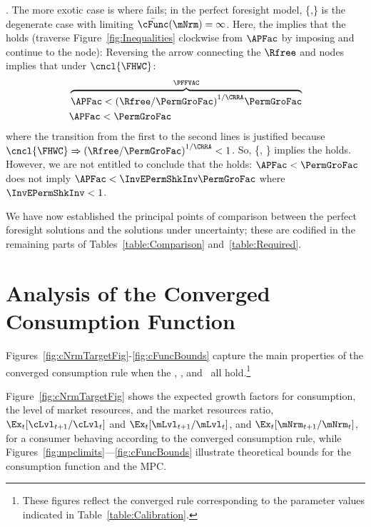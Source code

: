 \documentclass[BufferStockTheory]{subfiles}
\begin{document}
\noindent \textbf{\cncl{\FHWC}}.  The more exotic case is where {\FHWC} fails; in the perfect foresight model, \{{\RIC},\cncl{\FHWC}\} is the degenerate case with limiting $\bar{\cFunc}(\mNrm)=\infty$.  Here, the {\FVAC} implies that the {\PFFVAC} holds (traverse Figure~\ref{fig:Inequalities} clockwise from $\APFac$ by imposing {\FVAC} and continue to the {\PFVAFacDefn} node):  Reversing the arrow connecting the $\Rfree$ and {\PFVAFacDefn} nodes implies that under $\cncl{\FHWC}$:
\begin{align*}
  & \overbrace{\APFac < {(\Rfree/\PermGroFac)}^{1/\CRRA}\PermGroFac}^{\PFFVAC}
  \\ & \APFac < \PermGroFac
\end{align*}
where the transition from the first to the second lines is justified because $\cncl{\FHWC} \Rightarrow {(\Rfree/\PermGroFac)}^{1/\CRRA}<1$.  So, \{\RIC, \cncl{\FHWC}\} implies the {\GICRaw} holds.  However, we are not entitled to conclude that the {\GICMod} holds: $\APFac < \PermGroFac$ does not imply $\APFac < \InvEPermShkInv \PermGroFac$ where $\InvEPermShkInv<1$.  

We have now established the principal points of comparison between the perfect foresight solutions and the solutions under uncertainty; these are codified in the remaining parts of Tables~\ref{table:Comparison} and~\ref{table:Required}.

\hypertarget{Sufficient-Conditions}{}
\hypertarget{Sufficient-Conditions-For-Nondegenerate-Solution}{}


\hypertarget{AnalysisoftheConvergedConsumptionFunction}{}
\section{Analysis of the Converged Consumption Function}\label{sec:convergedcfunc}

Figures~\ref{fig:cNrmTargetFig}-\ref{fig:cFuncBounds} capture the main properties of the converged consumption rule when the \RIC, \GICMod, and \FHWC~all hold.\footnote{These figures reflect the converged rule corresponding to the parameter values indicated in Table~\ref{table:Calibration}.}

Figure~\ref{fig:cNrmTargetFig} shows the expected growth factors for consumption, the level of market resources, and the market resources ratio, $\Ex_{t}[\cLvl_{t+1}/\cLvl_{t}]$ and $\Ex_{t}[\mLvl_{t+1}/\mLvl_{t}]$, and $\Ex_{t}[\mNrm_{t+1}/\mNrm_{t}]$, for a consumer behaving according to the converged consumption rule, while Figures~\ref{fig:mpclimits}---\ref{fig:cFuncBounds} illustrate theoretical bounds for the consumption function and the MPC.
\end{document}
